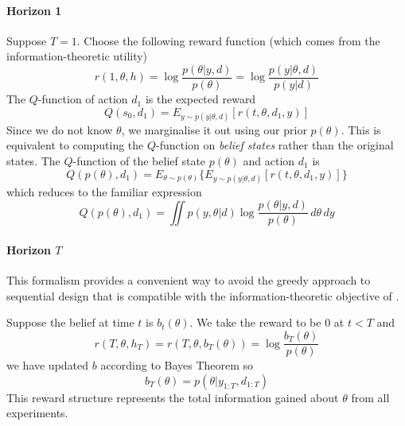 \paragraph{Horizon 1}
Suppose $T=1$. Choose the following reward function (which comes from the information-theoretic utility)
\begin{equation}
r(1, \theta, h) = \log \frac{p(\theta | y, d)}{p(\theta)} = \log \frac{p(y | \theta, d)}{p(y|d)}
\end{equation}
The $Q$-function of action $d_1$ is the expected reward
\begin{equation}
	Q(s_0, d_1) = E_{y \sim p(y|\theta, d)}[r(t, \theta, d_1, y)]
\end{equation}
Since we do not know $\theta$, we marginalise it out using our prior $p(\theta)$. This is equivalent to computing the $Q$-function on \textit{belief states} rather than the original states. The $Q$-function of the belief state $p(\theta)$ and action $d_1$ is
\begin{equation}
	Q(p(\theta), d_1) = E_{\theta \sim p(\theta)}\{E_{y \sim p(y|\theta, d)}[r(t, \theta, d_1, y)]\}
\end{equation}
which reduces to the familiar expression
\begin{equation}
	Q(p(\theta), d_1) = \iint p(y, \theta | d) \log \frac{p(\theta | y, d)}{p(\theta)} \, d\theta \, dy
\end{equation}

\paragraph{Horizon $T$}
This formalism provides a convenient way to avoid the greedy approach to sequential design that is compatible with the information-theoretic objective of \cite{lindley1956}.

Suppose the belief at time $t$ is $b_t(\theta)$. We take the reward to be $0$ at $t<T$ and
\begin{equation}
	r(T, \theta, h_T) = r(T, \theta, b_T(\theta)) = \log \frac{b_T(\theta) }{p(\theta)}
\end{equation}
we have updated $b$ according to Bayes Theorem so
\begin{equation}
	b_T(\theta) = p(\theta | y_{1:T}, d_{1:T})
\end{equation}
This reward structure represents the total information gained about $\theta$ from all experiments.

